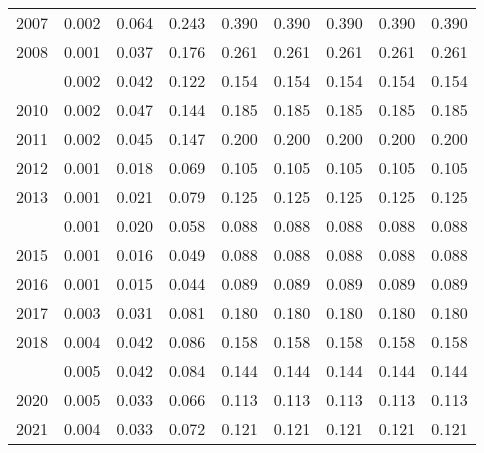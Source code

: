 \documentclass[
]{article}
\begin{document}
\begin{longtable}[t]{lrrrrrrrr}
2007 & 0.002 & 0.064 & 0.243 & 0.390 & 0.390 & 0.390 & 0.390 & 0.390\\
2008 & 0.001 & 0.037 & 0.176 & 0.261 & 0.261 & 0.261 & 0.261 & 0.261\\
\addlinespace
2009 & 0.002 & 0.042 & 0.122 & 0.154 & 0.154 & 0.154 & 0.154 & 0.154\\
2010 & 0.002 & 0.047 & 0.144 & 0.185 & 0.185 & 0.185 & 0.185 & 0.185\\
2011 & 0.002 & 0.045 & 0.147 & 0.200 & 0.200 & 0.200 & 0.200 & 0.200\\
2012 & 0.001 & 0.018 & 0.069 & 0.105 & 0.105 & 0.105 & 0.105 & 0.105\\
2013 & 0.001 & 0.021 & 0.079 & 0.125 & 0.125 & 0.125 & 0.125 & 0.125\\
\addlinespace
2014 & 0.001 & 0.020 & 0.058 & 0.088 & 0.088 & 0.088 & 0.088 & 0.088\\
2015 & 0.001 & 0.016 & 0.049 & 0.088 & 0.088 & 0.088 & 0.088 & 0.088\\
2016 & 0.001 & 0.015 & 0.044 & 0.089 & 0.089 & 0.089 & 0.089 & 0.089\\
2017 & 0.003 & 0.031 & 0.081 & 0.180 & 0.180 & 0.180 & 0.180 & 0.180\\
2018 & 0.004 & 0.042 & 0.086 & 0.158 & 0.158 & 0.158 & 0.158 & 0.158\\
\addlinespace
2019 & 0.005 & 0.042 & 0.084 & 0.144 & 0.144 & 0.144 & 0.144 & 0.144\\
2020 & 0.005 & 0.033 & 0.066 & 0.113 & 0.113 & 0.113 & 0.113 & 0.113\\
2021 & 0.004 & 0.033 & 0.072 & 0.121 & 0.121 & 0.121 & 0.121 & 0.121\\*
\end{longtable}
\end{document}
